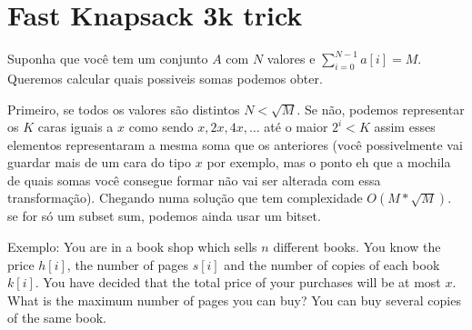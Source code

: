\section{Fast Knapsack 3k trick}
Suponha que você tem um conjunto $A$ com $N$ valores e $\sum_{i=0}^{N-1} a[i] = M$.
Queremos calcular quais possiveis somas podemos obter. 

Primeiro, se todos os valores são distintos $ N < \sqrt{M}$. Se não, podemos representar os $K$ 
caras iguais a $x$ como sendo $x, 2x, 4x, \dots$ até o maior $2^i < K$ assim esses elementos 
representaram a mesma soma que os anteriores (você possivelmente vai guardar mais de um cara do 
tipo $x$ por exemplo, mas o ponto eh que a mochila de quais somas você consegue formar não vai ser 
alterada com essa transformação). Chegando numa solução que tem complexidade $O(M*\sqrt M)$. se for 
só um subset sum, podemos ainda usar um bitset.

Exemplo: You are in a book shop which sells $n$ different books. You know the price $h[i]$, the number 
of pages $s[i]$ and the number of copies of each book $k[i]$. You have decided that the total price of 
your purchases will be at most $x$. What is the maximum number of pages you can buy? You can buy 
several copies of the same book.


